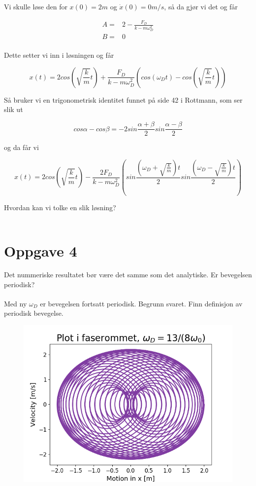 \documentclass[norsk,a4paper,12pt]{article}
\begin{document}
Vi skulle løse den for $x(0)=2m$ og $\dot{x}(0)=0 m/s$, så da gjør vi det og får 

\begin{align*}
	A =& 2 - \frac{F_D}{k-m\omega_D^2}\\
	B =& 0\\ 
\end{align*}

Dette setter vi inn i løsningen og får

\begin{equation}
	x(t) = 2 cos \left(\sqrt{\frac{k}{m}}t \right) + \frac{F_D}{k-m\omega_D^2} \left(cos(\omega_Dt)-cos \left(\sqrt{\frac{k}{m}}t \right) \right)
\end{equation}

Så bruker vi en trigonometrisk identitet funnet på side 42 i Rottmann, som ser slik ut

\begin{equation}
	cos \alpha - cos \beta = -2 sin\frac{\alpha + \beta}{2}sin\frac{\alpha -\beta}{2}
\end{equation}

og da får vi

\begin{equation}
	x(t) = 2 cos \left(\sqrt{\frac{k}{m}}t \right) - \frac{2F_D}{k-m\omega_D^2} \left(sin\frac{\left(\omega_D + \sqrt{\frac{k}{m}} \right)t}{2} sin\frac{\left(\omega_D - \sqrt{\frac{k}{m}} \right)t}{2} \right)
\end{equation}

Hvordan kan vi tolke en slik løsning?
\\
\\

\section*{Oppgave 4}

Det nummeriske resultatet bør være det samme som det analytiske. Er bevegelsen periodisk?
\\
\\
Med ny $\omega_D$ er bevegelsen fortsatt periodisk. Begrunn svaret. Finn definisjon av periodisk bevegelse.

\begin{figure}
\includegraphics[scale=0.8]{Oppgave4del1.png}
\end{figure}
\end{document}
